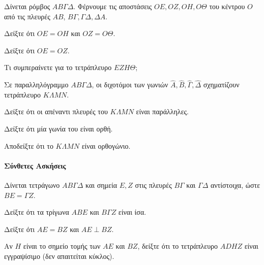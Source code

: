 \documentclass[11pt,a4paper,modern]{FFExercises}
\begin{document}
\begin{center}
\end{center}

\askhsh
Δίνεται ρόμβος $ΑΒ\varGamma\Delta$. Φέρνουμε τις αποστάσεις $OE, OZ, OH, O\Theta$ του κέντρου $O$ από τις πλευρές $AB$, $B\varGamma,\varGamma\Delta, \Delta A$.
\begin{alist}
    \item Δείξτε ότι $OE = OH$ και $OZ = O\Theta$.
    \item Δείξτε ότι $OE = OZ$.
    \item Τι συμπεραίνετε για το τετράπλευρο $EZH\Theta$;
\end{alist}

\askhsh
Σε παραλληλόγραμμο $ΑΒ\varGamma\Delta$, οι διχοτόμοι των γωνιών $\hat{Α}, \hat{B}, \hat{\varGamma}, \hat{\Delta}$ σχηματίζουν τετράπλευρο $Κ\Lambda ΜΝ$.
\begin{alist}
    \item Δείξτε ότι οι απέναντι πλευρές του $Κ\Lambda ΜΝ$ είναι παράλληλες.
    \item Δείξτε ότι μία γωνία του είναι ορθή.
    \item Αποδείξτε ότι το $Κ\Lambda ΜΝ$ είναι ορθογώνιο.
\end{alist}

\paragraph{Σύνθετες Ασκήσεις}

\askhsh
Δίνεται τετράγωνο $ΑΒ\varGamma\Delta$ και σημεία $E, Z$ στις πλευρές $Β\varGamma$ και $\varGamma\Delta$ αντίστοιχα, ώστε $BE = \varGamma Z$.
\begin{alist}
    \item Δείξτε ότι τα τρίγωνα $AB E$ και $B\varGamma Z$ είναι ίσα.
    \item Δείξτε ότι $AE = BZ$ και $AE \perp BZ$.
    \item Αν $H$ είναι το σημείο τομής των $AE$ και $BZ$, δείξτε ότι το τετράπλευρο $ADHZ$ είναι εγγραψίσιμο (δεν απαιτείται κύκλος).
\end{alist}
\end{document}
